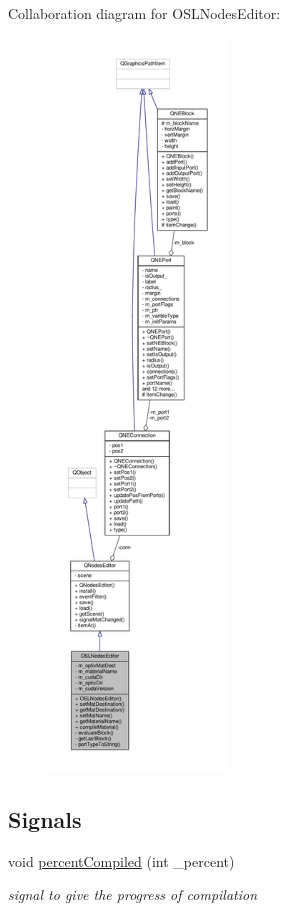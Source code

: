 Collaboration diagram for O\-S\-L\-Nodes\-Editor\-:
\nopagebreak
\begin{figure}[H]
\begin{center}
\leavevmode
\includegraphics[height=550pt]{class_o_s_l_nodes_editor__coll__graph}
\end{center}
\end{figure}
\subsection*{Signals}
\begin{DoxyCompactItemize}
\item 
void \hyperlink{class_o_s_l_nodes_editor_a7c204e417e08aa49683281b10385f37a}{percent\-Compiled} (int \-\_\-percent)
\begin{DoxyCompactList}\small\item\em signal to give the progress of compilation \end{DoxyCompactList}\end{DoxyCompactItemize}
